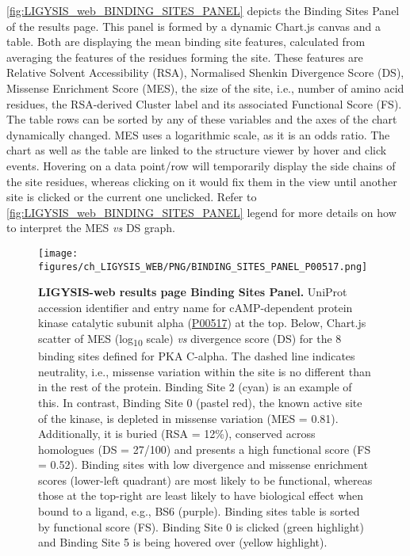 \autoref{fig:LIGYSIS_web_BINDING_SITES_PANEL} depicts the Binding Sites Panel of the results page. This panel is formed by a dynamic Chart.js canvas and a table. Both are displaying the mean binding site features, calculated from averaging the features of the residues forming the site. These features are Relative Solvent Accessibility (RSA), Normalised Shenkin Divergence Score (DS), Missense Enrichment Score (MES), the size of the site, i.e., number of amino acid residues, the RSA-derived Cluster label and its associated Functional Score (FS). The table rows can be sorted by any of these variables and the axes of the chart dynamically changed. MES uses a logarithmic scale, as it is an odds ratio. The chart as well as the table are linked to the structure viewer by hover and click events. Hovering on a data point/row will temporarily display the side chains of the site residues, whereas clicking on it would fix them in the view until another site is clicked or the current one unclicked. Refer to \autoref{fig:LIGYSIS_web_BINDING_SITES_PANEL} legend for more details on how to interpret the MES \textit{vs} DS graph.

\begin{figure}[htb!]
    \centering
    \texttt{[image: figures/ch\_LIGYSIS\_WEB/PNG/BINDING\_SITES\_PANEL\_P00517.png]}
    \caption[LIGYSIS-web results page Binding Sites Panel]{\textbf{LIGYSIS-web results page Binding Sites Panel.} UniProt accession identifier and entry name for cAMP-dependent protein kinase catalytic subunit alpha (\href{https://www.uniprot.org/uniprotkb/P00517/entry}{P00517}) at the top. Below, Chart.js scatter of MES (log\textsubscript{10} scale) \textit{vs} divergence score (DS) for the 8 binding sites defined for PKA C-alpha. The dashed line indicates neutrality, i.e., missense variation within the site is no different than in the rest of the protein. Binding Site 2 (cyan) is an example of this. In contrast, Binding Site 0 (pastel red), the known active site of the kinase, is depleted in missense variation (MES = 0.81). Additionally, it is buried (RSA = 12\%), conserved across homologues (DS = 27/100) and presents a high functional score (FS = 0.52). Binding sites with low divergence and missense enrichment scores (lower-left quadrant) are most likely to be functional, whereas those at the top-right are least likely to have biological effect when bound to a ligand, e.g., BS6 (purple). Binding sites table is sorted by functional score (FS). Binding Site 0 is clicked (green highlight) and Binding Site 5 is being hovered over (yellow highlight).}
    \label{fig:LIGYSIS_web_BINDING_SITES_PANEL}
\end{figure}

